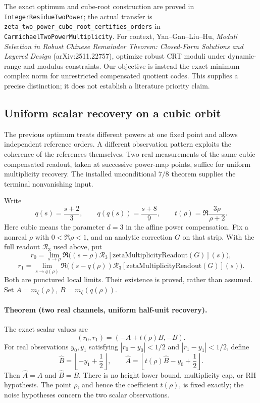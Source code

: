 The exact optimum and cube-root construction are proved in
\texttt{IntegerResidueTwoPower}; the actual transfer is
\texttt{zeta\_two\_power\_cube\_root\_certifies\_orders} in
\texttt{CarmichaelTwoPowerMultiplicity}.
For context, Yan--Gan--Liu--Hu, \emph{Moduli Selection in Robust Chinese
Remainder Theorem: Closed-Form Solutions and Layered Design}
(arXiv:2511.22757), optimize robust CRT moduli under dynamic-range and modulus
constraints. Our objective is instead the exact minimum complex norm for
unrestricted compensated quotient codes. This supplies a precise distinction;
it does not establish a literature priority claim.

\subsection{Uniform scalar recovery on a cubic orbit}
\label{sec:scalar-cubic-orbit}

The previous optimum treats different powers at one fixed point and allows
independent reference orders. A different observation pattern exploits the
coherence of the references themselves. Two real measurements of the same
cubic compensated readout, taken at successive power-map points, suffice for
uniform multiplicity recovery. The installed unconditional \(7/8\) theorem
supplies the terminal nonvanishing input.

Write
\[
 q(s)=\frac{s+2}{3},\qquad q(q(s))=\frac{s+8}{9},\qquad
 t(\rho)=\Re\frac{3\rho}{\rho+2}.
\]
Here cubic means the parameter \(d=3\) in the affine power compensation.
Fix a nonreal \(\rho\) with \(0<\Re\rho<1\), and an analytic correction
\(G\) on that strip. With the full readout \(\mathcal R_3\) used above, put
\[
 r_0=\lim_{s\to\rho}\Re\bigl((s-\rho)
     \mathcal R_3[\mathrm{zetaMultiplicityReadout}(G)](s)\bigr),
\]
\[
 r_1=\lim_{s\to q(\rho)}\Re\bigl((s-q(\rho))
     \mathcal R_3[\mathrm{zetaMultiplicityReadout}(G)](s)\bigr).
\]
Both are punctured local limits. Their existence is proved, rather than
assumed. Set \(A=m_\zeta(\rho)\), \(B=m_\zeta(q(\rho))\).

\paragraph{Theorem (two real channels, uniform half-unit recovery).}
The exact scalar values are
\[
 (r_0,r_1)=(-A+t(\rho)B,-B).
\]
For real observations \(y_0,y_1\) satisfying
\(|r_0-y_0|<1/2\) and \(|r_1-y_1|<1/2\), define
\[
 \widehat B=\left\lfloor-y_1+\frac12\right\rfloor,\qquad
 \widehat A=\left\lfloor t(\rho)\widehat B-y_0+\frac12\right\rfloor.
\]
Then \(\widehat A=A\) and \(\widehat B=B\).
There is no height lower bound, multiplicity cap, or RH hypothesis.
The point \(\rho\), and hence the coefficient \(t(\rho)\), is fixed exactly;
the noise hypotheses concern the two scalar observations.

